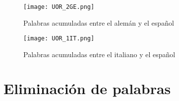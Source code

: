 \begin{figure}[h!]
	\centering
	\texttt{[image: UOR\_2GE.png]}
	\label{fig.U_GS}
	\caption{Palabras acumuladas entre el alemán y el español}
\end{figure}


\begin{figure}[h!]
	\centering
	\texttt{[image: UOR\_1IT.png]}
	\label{fig.U_IS}
	\caption{Palabras acumuladas entre el italiano y el español}
\end{figure}

\section{Eliminación de palabras}
\label{eliminacion.completa.apendice}